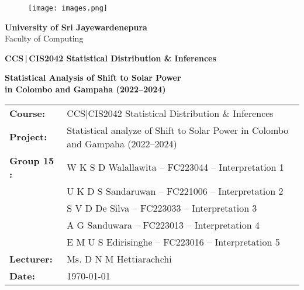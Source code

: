 \documentclass[12pt,a4paper]{article}
\begin{document}
\begin{titlepage}
\centering
\begin{figure}[H]
  \centering
  \texttt{[image: images.png]}
\end{figure}
{\Large \textbf{University of Sri Jayewardenepura}\\[0.3em] Faculty of Computing\par}
\vspace{1.5cm}
{\large \textbf{CCS\,|\,CIS2042 Statistical Distribution \& Inferences}\par}
\vspace{2.0cm}
{\LARGE \bfseries Statistical Analysis of Shift to Solar Power\\[0.25em] in Colombo and Gampaha (2022--2024)\par}
\vspace{1.2cm}
\begin{tabular}{ll}
\textbf{Course:} & CCS|CIS2042 Statistical Distribution \& Inferences \\
\textbf{Project:} & Statistical analyze of Shift to Solar Power in Colombo and Gampaha (2022--2024) \\
\textbf{Group 15 :} & W K S D Walallawita -- FC223044 -- Interpretation 1 \\
                 & U K D S Sandaruwan -- FC221006 -- Interpretation 2 \\
                 & S V D De Silva -- FC223033 -- Interpretation 3 \\
                 & A G Sanduwara -- FC223013 -- Interpretation 4 \\
                 & E M U S Edirisinghe -- FC223016 -- Interpretation 5 \\
\textbf{Lecturer:} & Ms. D N M Hettiarachchi \\
\textbf{Date:} & \today
\end{tabular}
\vfill
\end{titlepage}

\begin{abstract}
This research investigates the adoption of solar power in the Colombo and Gampaha districts of Sri Lanka during the period 2022--2024. The study analyzes the transition from grid electricity to solar power at the household and business levels and identifies the socio\hyp{}economic and demographic factors influencing this shift. Using survey data collected via Google Forms, we apply descriptive and inferential statistical techniques including chi\hyp{}square tests, t\hyp{}tests, confidence intervals, and logistic regression. The findings aim to provide evidence on adoption patterns, economic implications (bill reductions and investment levels), and perceived barriers, informing both academic discussions and policy practice.
\end{abstract}
\end{document}
